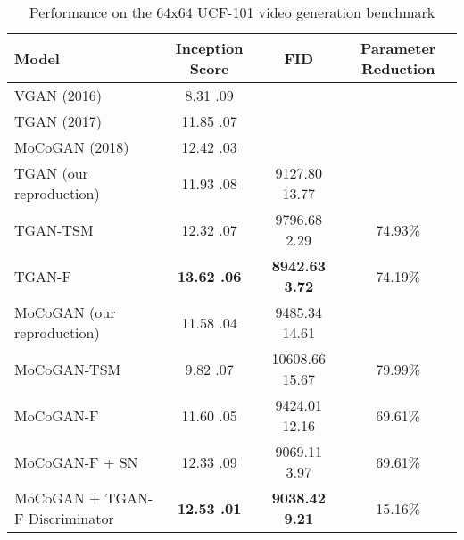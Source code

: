 \documentclass[a4paper,fleqn]{cas-sc}
\begin{document}
\begin{table}[pos=!h]
\centering
\caption{Performance on the 64x64 UCF-101 video generation benchmark}
\label{table:ldvd_is64}
    \begin{tabular}{lccc}
    \hline Model                                           & Inception Score              & FID  &     Parameter Reduction     \\
    \hline
    VGAN \cite{VondrickPT16generating} (2016)       & 8.31  .09                        &                 &                           \\
    TGAN \cite{SaitoMS17temporal} (2017)           & 11.85  .07                       &                 &                           \\
    MoCoGAN \cite{Tulyakov0YK18mocogan} (2018)     & 12.42  .03                       &                 &                           \\
    
    \hline
    TGAN (our reproduction)                            & 11.93  .08                      & 9127.80  13.77           &                        \\
    TGAN-TSM                                        & 12.32  .07                   &   9796.68  2.29          &           74.93\%     \\
    TGAN-F                                       & \textbf{13.62  .06}             &   \textbf{8942.63  3.72} &   74.19\%          \\
    \hline
    MoCoGAN  (our reproduction)                          & 11.58  .04                      & 9485.34  14.61           &                        \\
    MoCoGAN-TSM                                     & 9.82  .07                    &  10608.66  15.67         &   79.99\%            \\

    MoCoGAN-F                                    & 11.60  .05                       &   9424.01  12.16        &           69.61\%         \\
    
    MoCoGAN-F + SN                               & 12.33  .09                       &   9069.11  3.97         &           69.61\%         \\
    MoCoGAN + TGAN-F Discriminator               & \textbf{12.53  .01}              & \textbf{9038.42  9.21}  &           15.16\%         \\

    \hline \end{tabular}
\end{table}
\end{document}
